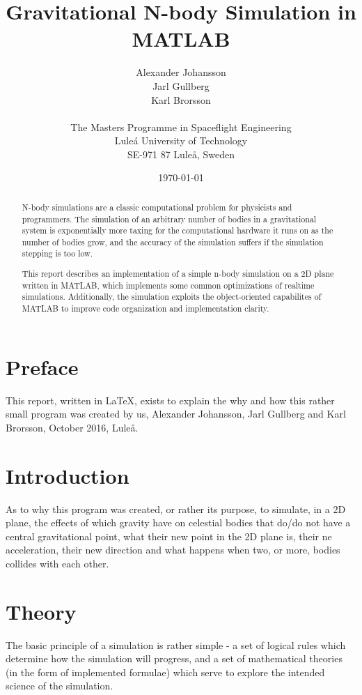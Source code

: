 \documentclass[11pt]{article}
\title{\textbf{Gravitational N-body Simulation in MATLAB}}
\author{Alexander Johansson\\
		Jarl Gullberg\\
		Karl Brorsson\\
		\\
		The Masters Programme in Spaceflight Engineering\\
		Lule\'a University of Technology\\SE-971 87 Luleå, Sweden}
\date{\today}
\begin{document}
\maketitle

\begin{abstract}
N-body simulations are a classic computational problem for physicists and programmers. The simulation of 
an arbitrary number of bodies in a gravitational system is exponentially more taxing for the computational 
hardware it runs on as the number of bodies grow, and the accuracy of the simulation suffers if the simulation
stepping is too low.

This report describes an implementation of a simple n-body simulation on a 2D plane written in MATLAB, which 
implements some common optimizations of realtime simulations. Additionally, the simulation exploits the 
object-oriented capabilites of MATLAB to improve code organization and implementation clarity.
\end{abstract}

\pagebreak
\tableofcontents

\pagebreak
\section{Preface}
This report, written in LaTeX, exists to explain the why and how this rather small program was created by us, Alexander Johansson, Jarl Gullberg and Karl Brorsson, October 2016, Luleå.

\section{Introduction}
As to why this program was created, or rather its purpose, to simulate, in a 2D plane, the effects of which gravity have on celestial bodies that do/do not have a central gravitational point, what their new point in the 2D plane is, their ne acceleration, their new direction and what happens when two, or more, bodies collides with each other.

\section{Theory}
The basic principle of a simulation is rather simple - a set of logical rules which determine how the 
simulation will progress, and a set of mathematical theories (in the form of implemented formulae) which
serve to explore the intended science of the simulation.
\end{document}

